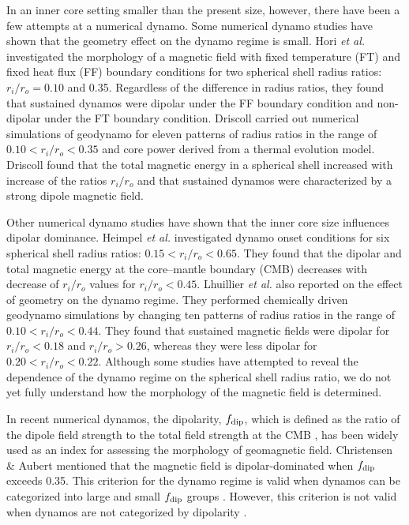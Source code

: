 {\color{red} %
In an inner core setting smaller than the present size, however, there have been a few attempts at a numerical dynamo. 
}
Some numerical dynamo studies have shown that the geometry effect on the dynamo regime is small. 
Hori {\it et al.}  investigated the morphology of a magnetic field with fixed temperature (FT) and fixed heat flux (FF) boundary conditions for two spherical shell radius ratios: $r_{i} / r_{o} = 0.10$ and 0.35. 
Regardless of the difference in radius ratios, they found that sustained dynamos were dipolar under the FF boundary condition and non-dipolar under the FT boundary condition. 
Driscoll  carried out numerical simulations of geodynamo for eleven patterns of radius ratios in the range of $0.10 < r_{i} / r_{o} < 0.35$ and core power derived from a thermal evolution model. 
Driscoll  found that the total magnetic energy in a spherical shell increased with increase of the ratios $r_{i} / r_{o}$ and that sustained dynamos were characterized by a strong dipole magnetic field.

Other numerical dynamo studies have shown that the inner core size influences dipolar dominance. Heimpel {\it et al.}  investigated dynamo onset conditions for six spherical shell radius ratios: $0.15 < r_{i} / r_{o} < 0.65$. 
They found that the dipolar and total magnetic energy at the core–mantle boundary (CMB) decreases with decrease of $r_{i} / r_{o}$ values for $r_{i} / r_{o} < 0.45$. 
Lhuillier {\it et al.}  also reported on the effect of geometry on the dynamo regime. 
They performed chemically driven geodynamo simulations by changing ten patterns of radius ratios in the range of $0.10 < r_{i} / r_{o} < 0.44$. 
They found that sustained magnetic fields were dipolar for  $r_{i} / r_{o} < 0.18$ and  $r_{i} / r_{o} > 0.26$, whereas they were less dipolar for $0.20 < r_{i} / r_{o} < 0.22$. 
Although some studies have attempted to reveal the dependence of the dynamo regime on the spherical shell radius ratio, we do not yet fully understand how the morphology of the magnetic field is determined.

In recent numerical dynamos, the dipolarity, $f_{\rm dip}$, which is defined as the ratio of the dipole field strength to the total field strength at the CMB \cite{Uli:2006}, has been widely used as an index for assessing the morphology of geomagnetic field. 
Christensen \& Aubert  mentioned that the magnetic field is dipolar-dominated when $f_{\rm dip}$ exceeds 0.35. 
This criterion for the dynamo regime is valid when dynamos can be categorized into large and small $f_{\rm dip}$ groups \cite{Soderlund:2012}. However, this criterion is not valid when dynamos are not categorized by dipolarity \cite{Aubert:2009}. 


